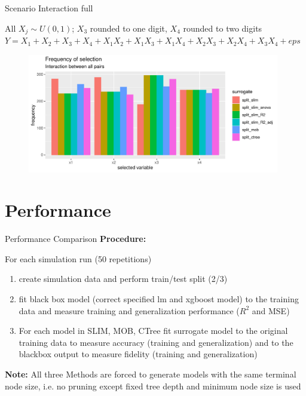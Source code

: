 \documentclass[9pt, xcolor=table]{beamer}
\begin{document}
\begin{frame}{Scenario Interaction full}

All $X_j \sim U(0,1)$; $X_3$ rounded to one digit, $X_4$ rounded to two digits\\
$Y = X_1 + X_2 + X_3 + X_4 + X_1 X_2 + X_1 X_3 + X_1 X_4 + X_2 X_3 + X_2 X_4 + X_3 X_4 + eps$
\begin{figure}
    \includegraphics[width=11cm]{Figures/Selection_Bias/interaction_full_frequency.pdf}
\end{figure}

\end{frame}


\section{Performance}
\begin{frame}{Performance Comparison}
\textbf{Procedure:} 

For each simulation run (50 repetitions)
\begin{enumerate}
    \item create simulation data and perform train/test split (2/3)
    \item fit black box model (correct specified lm and xgboost model) to the training data and measure training and generalization performance ($R^2$ and MSE)
    \item For each model in SLIM, MOB, CTree fit surrogate model to the original training data to measure accuracy (training and generalization) and to the blackbox output to measure fidelity (training and generalization)
\end{enumerate}

\textbf{Note:} All three Methods are forced to generate models with the same terminal node size, i.e. no pruning except fixed tree depth and minimum node size is used
\end{frame}
\end{document}
